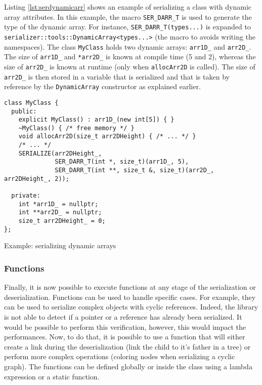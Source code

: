 Listing \ref{lst:serdynamicarr} shows an example of serializing a class with
dynamic array attributes. In this example, the macro \texttt{SER\_DARR\_T} is
used to generate the type of the dynamic array. For instance,
\texttt{SER\_DARR\_T(types...)} is expanded to
\texttt{serializer::tools::DynamicArray<types...>} (the macro to avoids writing
the namespaces). The class \texttt{MyClass} holds two dynamic arrays:
\texttt{arr1D\_} and \texttt{arr2D\_}. The size of \texttt{arr1D\_} and
\texttt{*arr2D\_} is known at compile time (5 and 2), whereas the size of
\texttt{arr2D\_} is known at runtime (only when \texttt{allocArr2D} is called).
The size of \texttt{arr2D\_} is then stored in a variable that is serialized and
that is taken by reference by the \texttt{DynamicArray} constructor as explained
earlier.

\begin{listing}[ht!]
\begin{verbatim}
class MyClass {
  public:
    explicit MyClass() : arr1D_(new int[5]) { }
    ~MyClass() { /* free memory */ }
    void allocArr2D(size_t arr2DHeight) { /* ... */ }
    /* ... */
    SERIALIZE(arr2DHeight_,
              SER_DARR_T(int *, size_t)(arr1D_, 5),
              SER_DARR_T(int **, size_t &, size_t)(arr2D_, arr2DHeight_, 2));

  private:
    int *arr1D_ = nullptr;
    int **arr2D_ = nullptr;
    size_t arr2DHeight_ = 0;
};
\end{verbatim}
\caption{Example: serializing dynamic arrays}
\label{lst:serdynamicarr}
\end{listing}

\subsubsection{Functions}

Finally, it is now possible to execute functions at any stage of the
serialization or deserialization. Functions can be used to handle specific
cases. For example, they can be used to serialize complex objects with cyclic
references. Indeed, the library is not able to detect if a pointer or a
reference has already been serialized. It would be possible to perform this
verification, however, this would impact the performances. Now, to do that, it
is possible to use a function that will either create a link during the
deserialization (link the child to it's father in a tree) or perform more
complex operations (coloring nodes when serializing a cyclic graph). The
functions can be defined globally or inside the class using a lambda expression
or a static function.

